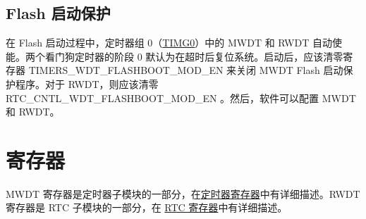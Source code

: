 \documentclass[main\_\_CN.tex]{subfiles}
\begin{document}
\subsection{Flash 启动保护}
在 Flash 启动过程中，定时器组 0（\hyperref[TIMG0]{TIMG0}）中的 MWDT 和 RWDT 自动使能。两个看门狗定时器的阶段 0 默认为在超时后复位系统。启动后，应该清零寄存器 TIMERS\_WDT\_FLASHBOOT\_MOD\_EN 来关闭 MWDT Flash 启动保护程序。对于 RWDT，则应该清零 RTC\_CNTL\_WDT\_FLASHBOOT\_MOD\_EN 。然后，软件可以配置 MWDT 和 RWDT。

\section{寄存器}
MWDT 寄存器是定时器子模块的一部分，在\hyperref[timer_registers]{定时器寄存器}中有详细描述。RWDT 寄存器是 RTC 子模块的一部分，在 \hyperref[register summary-30]{RTC 寄存器}中有详细描述。
\end{document}
